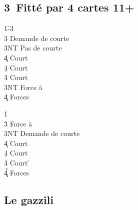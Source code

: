 \documentclass[a4paper]{article}
\begin{document}
\subsection{3\pdfd\ Fitté par 4 cartes 11+}

\begin{bidtable}
1\h-3\d\\
3\s \> Demande de courte\+\\
3NT \> Pas de courte\+\\
4\c \> Court \c \\
4\d \> Court \d \\
4\h \> Court \s \-\-\\
3NT \> Force à \s \\
4\c\d \> Forces
\end{bidtable}

\begin{bidtable}
1\d\\
3\h \> Force à \h \\
3NT \> Demande de courte\+\\
4\c \> Court \c \\
4\d \> Court \d \\
4\h \> Court \h \-\\
4\c\d\h \> Forces
\end{bidtable}

\subsection{Le gazzili}
\end{document}
